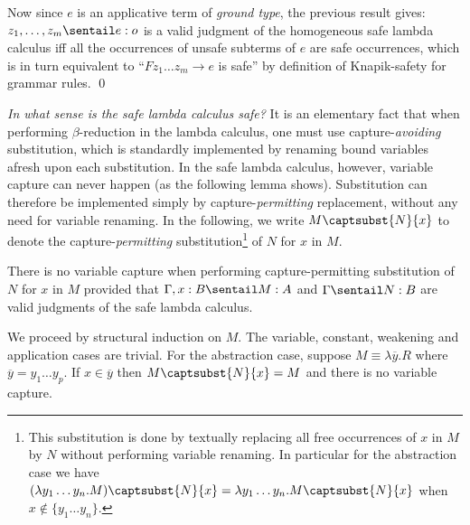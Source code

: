Now since $e$ is an applicative term of \emph{ground type}, the previous result gives:
$z_1,\ldots, z_m \sentail e:o$ is a valid judgment of the homogeneous safe lambda calculus iff
all the occurrences of unsafe subterms of $e$ are safe occurrences, which is in turn equivalent to ``$F z_1 \ldots z_m \rightarrow e$ is safe'' by definition of Knapik-safety for grammar rules. \qed
\bigskip

\emph{In what sense is the safe lambda calculus safe?} It is an
elementary fact that when performing $\beta$-reduction in the lambda
calculus, one must use capture-\emph{avoiding} substitution, which
is standardly implemented by renaming bound variables afresh upon
each substitution. In the safe lambda calculus, however, variable
capture can never happen (as the following lemma shows).
Substitution can therefore be implemented simply by
capture-\emph{permitting} replacement, without any need for variable
renaming. In the following, we write $M\captsubst{N}{x}$ to denote
the capture-\emph{permitting} substitution\footnote{This
substitution is done by textually replacing all free occurrences of
$x$ in $M$ by $N$ without performing variable renaming.  In
particular for the abstraction
  case we have
$(\lambda y_1\ldots y_n . M)\captsubst{N}{x} = \lambda y_1\ldots y_n . M\captsubst{N}{x}$ when $x\not\in
  \{ y_1\ldots y_n \}$.}
of $N$ for $x$ in $M$.

\begin{lemma}\label{lem:nvc}
\label{lem:nocapture} There is no variable capture when performing
capture-permitting substitution of $N$ for $x$ in $M$ provided that
$\Gamma, x:B \sentail M : A$ and $\Gamma \sentail  N : B$ are valid
judgments of the safe lambda calculus.
\end{lemma}

\proof
  We proceed by structural induction on $M$. The variable, constant, weakening and
  application cases are trivial. For the abstraction case, suppose $M \equiv \lambda \overline{y}. R$ where $\overline{y} = y_1 \ldots y_p$. If $x \in \overline{y}$ then $M \captsubst{N}{x} = M$ and there is no variable capture.

